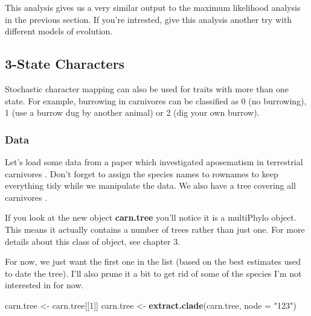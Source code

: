 \documentclass[
]{book}
\newenvironment{Shaded}{\begin{snugshade}}{\end{snugshade}}
\newcommand{\DataTypeTok}[1]{\textcolor[rgb]{0.13,0.29,0.53}{#1}}
\newcommand{\DecValTok}[1]{\textcolor[rgb]{0.00,0.00,0.81}{#1}}
\newcommand{\KeywordTok}[1]{\textcolor[rgb]{0.13,0.29,0.53}{\textbf{#1}}}
\newcommand{\NormalTok}[1]{#1}
\newcommand{\OperatorTok}[1]{\textcolor[rgb]{0.81,0.36,0.00}{\textbf{#1}}}
\newcommand{\StringTok}[1]{\textcolor[rgb]{0.31,0.60,0.02}{#1}}
\begin{document}
This analysis gives us a very similar output to the maximum likelihood analysis in the previous section. If you're intrested, give this analysis another try with different models of evolution.

\hypertarget{state-characters-1}{%
\subsection{3-State Characters}\label{state-characters-1}}

Stochastic character mapping can also be used for traits with more than one state. For example, burrowing in carnivores can be classified as 0 (no burrowing), 1 (use a burrow dug by another animal) or 2 (dig your own burrow).

\hypertarget{data-2}{%
\subsubsection{Data}\label{data-2}}

Let's load some data from a paper which investigated aposematism in terrestrial carnivores \citep{Stankowich11}. Don't forget to assign the species names to rownames to keep everything tidy while we manipulate the data. We also have a tree covering all carnivores \citep{Nyakatura12}.

\begin{Shaded}
\end{Shaded}

If you look at the new object \textbf{carn.tree} you'll notice it is a multiPhylo object. This means it actually contains a number of trees rather than just one. For more details about this class of object, see chapter 3.

For now, we just want the first one in the list (based on the best estimates used to date the tree). I'll also prune it a bit to get rid of some of the species I'm not interested in for now.

\begin{Shaded}
\begin{Highlighting}[]
\NormalTok{carn.tree \textless{}{-}}\StringTok{ }\NormalTok{carn.tree[[}\DecValTok{1}\NormalTok{]]}
\NormalTok{carn.tree \textless{}{-}}\StringTok{ }\KeywordTok{extract.clade}\NormalTok{(carn.tree, }\DataTypeTok{node =} \StringTok{"\textquotesingle{}123\textquotesingle{}"}\NormalTok{)}
\end{Highlighting}
\end{Shaded}
\end{document}
